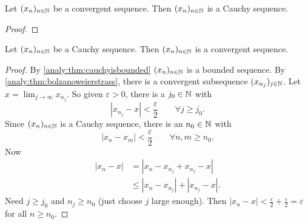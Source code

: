 \documentclass[10pt, a4paper]{article}
\newcommand{\seq}[1][x]{(#1_n)_{n \in \N}}
\begin{document}
\begin{theorem}
    Let $\seq$ be a convergent sequence.
    Then $\seq$ is a Cauchy sequence.
    \begin{proof}
        
    \end{proof}
\end{theorem}

\begin{theorem}
    Let $\seq$ be a Cauchy sequence.
    Then $\seq$ is a convergent sequence.
    \begin{proof}
        By \autoref{analy:thm:cauchyisbounded} $\seq$ is a bounded sequence.
        By \autoref{analy:thm:bolzanoweierstrass},
        there is a convergent subsequence $(x_{n_j})_{j \in \mathbb{N}}$.
        Let $x = \lim_{j \rightarrow \infty}x_{n_j}$.
        So given $\varepsilon > 0$,
        there is a $j_0 \in \mathbb{N}$ with
        \[
        |x_{n_j} - x| < \frac{\varepsilon}{2}\qquad\forall j \geq j_0.
        \]
        Since $\seq$ is a Cauchy sequence,
        there is an $n_0 \in \mathbb{N}$ with
        \[
        |x_n - x_m| < \frac{\varepsilon}{2}\qquad\forall n, m \geq n_0.
        \]
        Now
        \begin{align*}
            |x_n - x| &= |x_n - x_{n_j} + x_{n_j} - x| \\
            &\leq |x_n - x_{n_j}| + |x_{n_j} - x|.
        \end{align*}
        Need $j \geq j_0$ and $n_j \geq n_0$
        (just choose $j$ large enough).
        Then $|x_n - x| < \frac{\varepsilon}{2} + \frac{\varepsilon}{2} = \varepsilon$ for all $n \geq n_0$.
    \end{proof}
\end{theorem}
\end{document}
